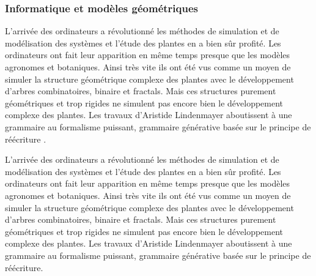 \subsubsection{Informatique et modèles géométriques}

L’arrivée des ordinateurs a révolutionné les méthodes de simulation et de modélisation des systèmes et l’étude des plantes en a bien sûr profité.
Les ordinateurs ont fait leur apparition en même temps presque que les modèles agronomes et botaniques. Ainsi très vite ils ont été vus comme un moyen de simuler la structure géométrique complexe des plantes avec le développement d’arbres combinatoires, binaire et fractals. Mais ces structures purement géométriques et trop rigides ne simulent pas encore bien le développement complexe des plantes.
Les travaux d’Aristide Lindenmayer aboutissent à une grammaire au formalisme puissant, grammaire générative basée sur le principe de réécriture \cite{LSystem}.

L’arrivée des ordinateurs a révolutionné les méthodes de simulation et de modélisation des systèmes et l’étude des plantes en a bien sûr profité.
Les ordinateurs ont fait leur apparition en même temps presque que les modèles agronomes et botaniques. Ainsi très vite ils ont été vus comme un moyen de simuler la structure géométrique complexe des plantes avec le développement d’arbres combinatoires, binaire et fractals. Mais ces structures purement géométriques et trop rigides ne simulent pas encore bien le développement complexe des plantes.
Les travaux d’Aristide Lindenmayer aboutissent à une grammaire au formalisme puissant, grammaire générative basée sur le principe de réécriture.


